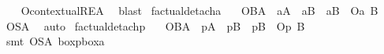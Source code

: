 \begin{isabellebody}
%
\isadelimproof
\ \ %
\endisadelimproof
%
\isatagproof
{}\isamarkupfalse%
\ O{\isacharunderscore}contextual{\isacharunderscore}REA\ \isamarkupfalse%
\ blast\isanewline
\isanewline
%
%
\endisatagproof
{\isafoldproof}%
%
\isadelimproof
\isanewline
%
\endisadelimproof
{}\isamarkupfalse%
\ factual{\isacharunderscore}detach{\isacharunderscore}a{\isacharcolon}\isanewline
\ \ \ {\isachardoublequoteopen}{\isasymTurnstile}{\isacharparenleft}{\isacharparenleft}{\isacharparenleft}O{\isacharbraceleft}B{\isacharbar}A{\isacharbraceright}\ \isactrlbold {\isasymand}\ {\isacharparenleft}{\isasymbox}\isactrlsub aA{\isacharparenright}{\isacharparenright}\ \isactrlbold {\isasymand}\ {\isacharparenleft}{\isacharparenleft}{\isasymdiamond}\isactrlsub aB{\isacharparenright}\ \isactrlbold {\isasymand}\ {\isacharparenleft}{\isasymdiamond}\isactrlsub a{\isacharparenleft}\isactrlbold {\isasymnot}B{\isacharparenright}{\isacharparenright}{\isacharparenright}{\isacharparenright}\ \isactrlbold {\isasymrightarrow}\ {\isacharparenleft}O\isactrlsub a\ B{\isacharparenright}{\isacharparenright}{\isachardoublequoteclose}\isanewline
%
\isadelimproof
\ \ %
\endisadelimproof
%
\isatagproof
{}\isamarkupfalse%
\ O{\isacharunderscore}SA\ \isamarkupfalse%
\ auto%
\endisatagproof
{\isafoldproof}%
%
\isadelimproof
\isanewline
%
\endisadelimproof
{}\isamarkupfalse%
\ factual{\isacharunderscore}detach{\isacharunderscore}p{\isacharcolon}\isanewline
\ \ \ {\isachardoublequoteopen}{\isasymTurnstile}{\isacharparenleft}{\isacharparenleft}{\isacharparenleft}O{\isacharbraceleft}B{\isacharbar}A{\isacharbraceright}\ \isactrlbold {\isasymand}\ {\isacharparenleft}{\isasymbox}\isactrlsub pA{\isacharparenright}{\isacharparenright}\ \isactrlbold {\isasymand}\ {\isacharparenleft}{\isacharparenleft}{\isasymdiamond}\isactrlsub pB{\isacharparenright}\ \isactrlbold {\isasymand}\ {\isacharparenleft}{\isasymdiamond}\isactrlsub p{\isacharparenleft}\isactrlbold {\isasymnot}B{\isacharparenright}{\isacharparenright}{\isacharparenright}{\isacharparenright}\ \isactrlbold {\isasymrightarrow}\ {\isacharparenleft}O\isactrlsub p\ B{\isacharparenright}{\isacharparenright}{\isachardoublequoteclose}\isanewline
%
\isadelimproof
\ \ %
\endisadelimproof
%
\isatagproof
{}\isamarkupfalse%
\ {\isacharparenleft}smt\ O{\isacharunderscore}SA\ boxp{\isacharunderscore}boxa{\isacharparenright}%
\endisatagproof
{\isafoldproof}%
%
\isadelimproof
\isanewline
%
\endisadelimproof
\isanewline
%
\isadelimtheory
\isanewline
%
\endisadelimtheory
%
\isatagtheory
{}\isamarkupfalse%
%
\endisatagtheory
{\isafoldtheory}%
%
\isadelimtheory
%
\endisadelimtheory
%
\end{isabellebody}%
